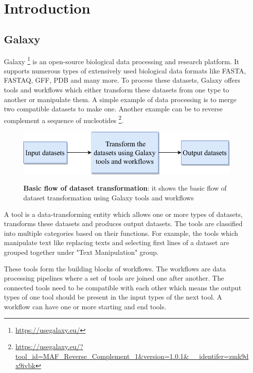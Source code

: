 \chapter{Introduction}\label{chap:introduction}
\section{Galaxy}
Galaxy {\footnote{\url{https://usegalaxy.eu/}}} is an open-source biological data processing and research platform. It supports numerous types of extensively used biological data formats like FASTA, FASTAQ, GFF, PDB and many more. To process these datasets, Galaxy offers tools and workflows which either transform these datasets from one type to another or manipulate them. A simple example of data processing is to merge two compatible datasets to make one. Another example can be to reverse complement a sequence of nucleotides \footnote{\url{https://usegalaxy.eu/?tool_id=MAF_Reverse_Complement_1&version=1.0.1&__identifer=zmk9dx9ivbk}}.

\begin{figure}[h]
\begin{centering}
    {\includegraphics[scale=0.8]{figures/image_Galaxy_1.pdf}}
    \caption[Basic flow of dataset transformation]{\textbf{Basic flow of dataset transformation}: it shows the basic flow of dataset transformation using Galaxy tools and workflows}
\end{centering}
\end{figure}

A tool is a data-transforming entity which allows one or more types of datasets, transforms these datasets and produces output datasets. The tools are classified into multiple categories based on their functions. For example, the tools which manipulate text like replacing texts and selecting first lines of a dataset are grouped together under "Text Manipulation" group.

These tools form the building blocks of workflows. The workflows are data processing pipelines where a set of tools are joined one after another. The connected tools need to be compatible with each other which means the output types of one tool should be present in the input types of the next tool. A workflow can have one or more starting and end tools.

